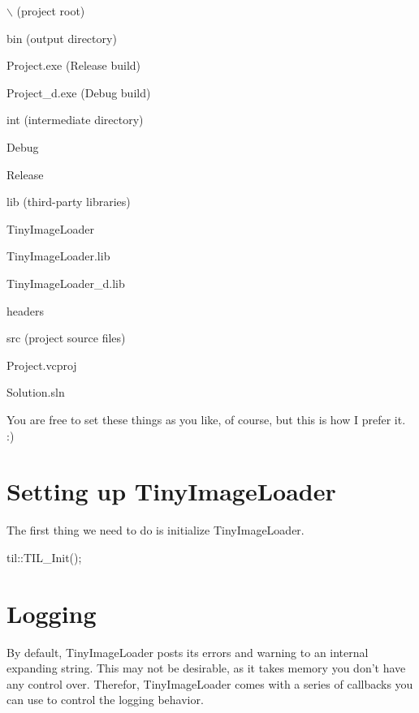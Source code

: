 \begin{DoxyItemize}
\item $\backslash$ (project root)
\begin{DoxyItemize}
\item bin (output directory)
\begin{DoxyItemize}
\item Project.exe (Release build)
\item Project\_\-d.exe (Debug build)
\end{DoxyItemize}
\item int (intermediate directory)
\begin{DoxyItemize}
\item Debug
\item Release
\end{DoxyItemize}
\item lib (third-\/party libraries)
\begin{DoxyItemize}
\item TinyImageLoader
\begin{DoxyItemize}
\item TinyImageLoader.lib
\item TinyImageLoader\_\-d.lib
\item headers
\end{DoxyItemize}
\end{DoxyItemize}
\item src (project source files)
\item Project.vcproj
\item Solution.sln
\end{DoxyItemize}
\end{DoxyItemize}

You are free to set these things as you like, of course, but this is how I prefer it. :)\hypertarget{example1_startup}{}\section{Setting up TinyImageLoader}\label{example1_startup}
The first thing we need to do is initialize TinyImageLoader. 
\begin{DoxyCode}
        til::TIL_Init();
\end{DoxyCode}
\hypertarget{example1_logging}{}\section{Logging}\label{example1_logging}
By default, TinyImageLoader posts its errors and warning to an internal expanding string. This may not be desirable, as it takes memory you don't have any control over. Therefor, TinyImageLoader comes with a series of callbacks you can use to control the logging behavior.

